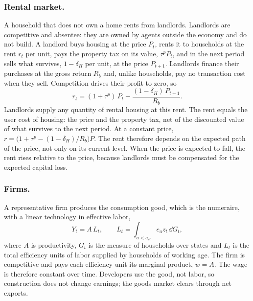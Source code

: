 \subsubsection*{Rental market.}
A household that does not own a home rents from landlords. Landlords are
competitive and absentee: they are owned by agents outside the economy and do
not build. A landlord buys housing at the price $P_t$, rents it to households
at the rent $r_t$ per unit, pays the property tax on its value, $\tau^pP_t$,
and in the next period sells what survives, $1-\delta_H$ per unit, at the
price $P_{t+1}$. Landlords finance their purchases at the gross return $R_b$
and, unlike households, pay no transaction cost when they sell. Competition
drives their profit to zero, so
\begin{equation}
 r_t=(1+\tau^p)\,P_t-\frac{(1-\delta_H)\,P_{t+1}}{R_b} .
 \label{eq:m-rent}
\end{equation}
Landlords supply any quantity of rental housing at this rent. The rent equals
the user cost of housing: the price and the property tax, net of the
discounted value of what survives to the next period. At a constant price,
$r=\bigl(1+\tau^p-(1-\delta_H)/R_b\bigr)P$. The rent therefore depends on the
expected path of the price, not only on its current level. When the price is
expected to fall, the rent rises relative to the price, because landlords must
be compensated for the expected capital loss.

\subsubsection*{Firms.}
A representative firm produces the consumption good, which is the numeraire,
with a linear technology in effective labor,
\begin{equation*}
 Y_t=A\,L_t,\qquad L_t=\int_{a<a_R}e_az_t\,\dd G_t,
\end{equation*}
where $A$ is productivity, $G_t$ is the measure of households over states and
$L_t$ is the total efficiency units of labor supplied by households of working
age. The firm is competitive and pays each efficiency unit its marginal
product, $w=A$. The wage is therefore constant over time. Developers use the
good, not labor, so construction does not change earnings; the goods market
clears through net exports.

